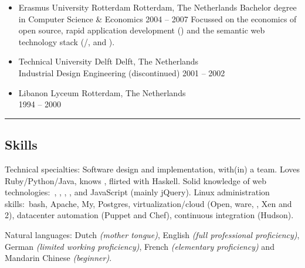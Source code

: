 \documentclass[10pt,a4paper]{article}
\begin{document}
\begin{itemize} \parskip=0.1em

  \item  %
  \headerrow
    {Erasmus University Rotterdam}
    {\sc Rotterdam, The Netherlands}
  \subheaderrow
    {Bachelor degree in Computer Science \& Economics}
    {2004 -- 2007}
  Focussed on the economics of open source, rapid application development () and the semantic web technology stack (/,  and ).

  \item  %
  \headerrow
    {Technical University Delft}
    {\sc Delft, The Netherlands}
  \\
  \subheaderrow
    {Industrial Design Engineering (discontinued)}
    {2001 -- 2002}

  \item  %
  \headerrow
    {Libanon Lyceum}
    {\sc Rotterdam, The Netherlands}
  \\
  \subheaderrow
    {}
    {1994 -- 2000}

\end{itemize}
\vspace{-0.3em}

\hrule \vspace{-0.4em} \subsection*{Skills}

  \begin{indentsection}{\parindent}  %
  \begin{description*}
    \item[Technical specialties:]
    Software design and implementation, with(in) a team. Loves Ruby/Python/Java, knows \CPP, flirted with Haskell. Solid knowledge of web technologies:\ , , , ,  and JavaScript (mainly jQuery). Linux administration skills:\ bash, Apache, My, Postgres, virtualization/cloud (Open, ware, , Xen and 2), datacenter automation (Puppet and Chef), continuous integration (Hudson).
  \end{description*}
  \end{indentsection}

  \begin{indentsection}{\parindent}  %
  \begin{description*}
    \item[Natural languages:]
    Dutch \emph{(mother tongue)}, English \emph{(full professional proficiency)}, German \emph{(limited working proficiency)}, French \emph{(elementary proficiency)} and Mandarin Chinese \emph{(beginner)}.
  \end{description*}
  \end{indentsection}
\end{document}
